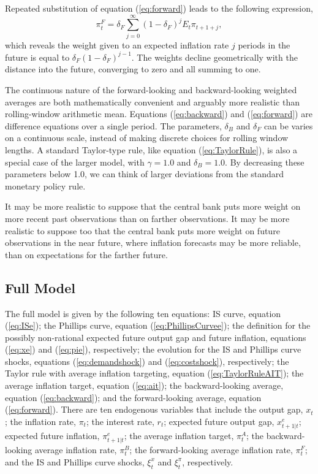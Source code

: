 \documentclass[english,authoryear,12pt]{elsarticle}
\begin{document}
Repeated substitution of equation (\ref{eq:forward}) leads to the following expression,
\begin{equation}\label{eq:forward_all}
	\pi_t^F = \delta_F \sum_{j=0}^{\infty} (1-\delta_F)^j E_t \pi_{t+1+j},
\end{equation}
which reveals the weight given to an expected inflation rate $j$ periods in the future is equal to $\delta_F (1-\delta_F)^{j-1}$. The weights decline geometrically with the distance into the future, converging to zero and all summing to one.



The continuous nature of the forward-looking and backward-looking weighted averages are both mathematically convenient and arguably more realistic than rolling-window arithmetic mean. Equations (\ref{eq:backward}) and (\ref{eq:forward}) are difference equations over a single period. The parameters, $\delta_B$ and $\delta_F$ can be varies on a continuous scale, instead of making discrete choices for rolling window lengths. A standard Taylor-type rule, like equation (\ref{eq:TaylorRule}), is also a special case of the larger model, with $\gamma=1.0$ and $\delta_B=1.0$. By decreasing these parameters below 1.0, we can think of larger deviations from the standard monetary policy rule.

It may be more realistic to suppose that the central bank puts more weight on more recent past observations than on farther observations. It may be more realistic to suppose too that the central bank puts more weight on future observations in the near future, where inflation forecasts may be more reliable, than on expectations for the farther future.

\subsection{Full Model}

The full model is given by the following ten equations: IS curve, equation (\ref{eq:ISe}); the Phillips curve, equation (\ref{eq:PhillipsCurvee}); the definition for the possibly non-rational expected future output gap and future inflation, equations (\ref{eq:xe}) and (\ref{eq:pie}), respectively; the evolution for the IS and Phillips curve shocks, equations (\ref{eq:demandshock}) and (\ref{eq:costshock}), respectively; the Taylor rule with average inflation targeting, equation (\ref{eq:TaylorRuleAIT}); the average inflation target, equation (\ref{eq:ait}); the backward-looking average, equation (\ref{eq:backward}); and the forward-looking average, equation (\ref{eq:forward}). There are ten endogenous variables that include the output gap, $x_t$; the inflation rate, $\pi_t$; the interest rate, $r_t$; expected future output gap, $x_{t+1|t}^e$; expected future inflation, $\pi_{t+1|t}^e$; the average inflation target, $\pi_t^A$; the backward-looking average inflation rate, $\pi_t^B$; the forward-looking average inflation rate, $\pi_t^F$; and the IS and Phillips curve shocks, $\xi_t^x$ and $\xi_t^\pi$, respectively.
\end{document}
